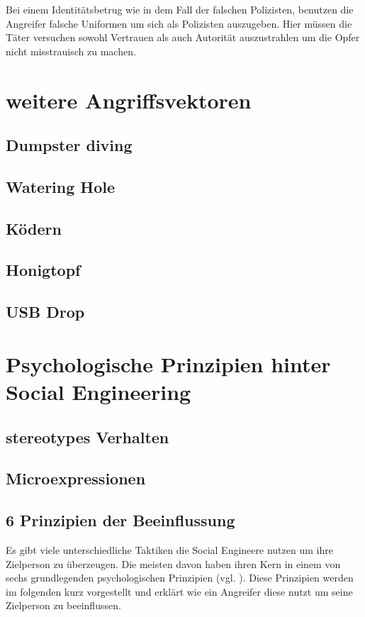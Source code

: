 Bei einem Identitätsbetrug wie in dem Fall der falschen Polizisten, benutzen die Angreifer falsche Uniformen um sich als Polizisten auszugeben. Hier müssen die Täter versuchen sowohl Vertrauen als auch Autorität auszustrahlen um die Opfer nicht misstrauisch zu machen. 

\section{weitere Angriffsvektoren}

\subsection{Dumpster diving}
\subsection{Watering Hole}
\subsection{Ködern}
\subsection{Honigtopf}
\subsection{USB Drop}



\section{Psychologische Prinzipien hinter Social Engineering}

\subsection{stereotypes Verhalten}
\subsection{Microexpressionen}

\subsection{6 Prinzipien der Beeinflussung}
Es gibt viele unterschiedliche Taktiken die Social Engineere nutzen um ihre Zielperson zu überzeugen. Die meisten davon haben ihren Kern in einem von sechs grundlegenden psychologischen Prinzipien (vgl. \cite{PsychDesÜberzeugens}). Diese Prinzipien werden im folgenden kurz vorgestellt und erklärt wie ein Angreifer diese nutzt um seine Zielperson zu beeinflussen.  

